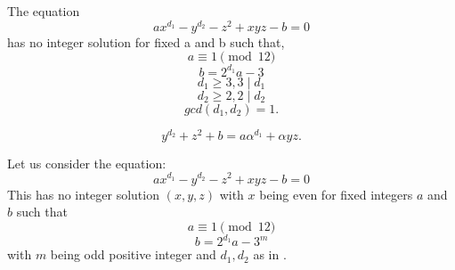 \documentclass[10pt,a4paper]{amsart}
\begin{document}
\begin{thm}
The equation 
\[ax^{d_1}-y^{d_2}-z^2+xyz-b=0\] has no integer solution for fixed a and b such that,
\[a\equiv 1 \pmod {12}\]
\[b=2^{d_1}a-3\]
\[d_1 \geq 3 , 3\mid {d_1}\]
\[d_2 \geq 2, 2\mid {d_2}\]
\[gcd(d_1, d_2)=1.\]\label{th1}
\end{thm}

\begin{equation}
  y^{d_2}+z^2+b=a\alpha^{d_1}+\alpha yz.  \label{eq2} 
\end{equation}

\begin{corollary}\label{cor:1}
    Let us consider the equation:
    \[ax^{d_1}-y^{d_2}-z^2+xyz-b=0\]
    This has no integer solution $(x,y,z)$ with $x$ being even for fixed integers $a$ and $b$ such that
    \[a\equiv 1 \pmod {12}\]
\[b=2^{d_1}a-3^m\] with $m$ being odd positive integer and $d_1, d_2$ as in . 
\end{corollary}
\end{document}
